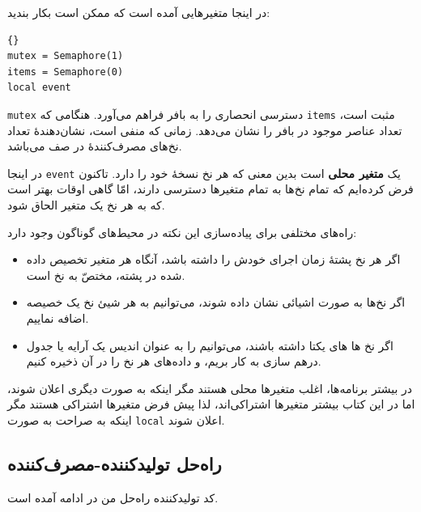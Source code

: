 \documentclass{book}
\newcommand{\clearemptydoublepage}{}%
\begin{document}
    در اینجا متغیرهایی آمده است که ممکن است بکار بندید:

\begin{latin}
\begin{lstlisting}[title=\rl{مقداردهی اولیه تولیدکننده-مصرف‌کننده}]{}
mutex = Semaphore(1)
items = Semaphore(0)
local event
\end{lstlisting}
\end{latin}

    {\tt mutex} دسترسی انحصاری را به بافر فراهم می‌آورد. 
    هنگامی که {\tt items} مثبت است، تعداد عناصر موجود در بافر را نشان می‌دهد. 
    زمانی که منفی است، نشان‌دهندهٔ تعداد نخ‌های مصرف‌کنندهٔ در صف می‌باشد. 

    در اینجا {\tt event}
    یک \textbf{متغیر محلی} است بدین معنی که هر نخ نسخهٔ خود را دارد.
    تاکنون فرض کرده‌ایم که تمام نخ‌ها به تمام متغیرها دسترسی دارند، امّا گاهی اوقات بهتر است که به هر نخ یک متغیر الحاق شود.

    راه‌های مختلفی برای پیاده‌سازی این نکته در محیط‌های گوناگون وجود دارد:
    
\begin{itemize}

\item 
    اگر هر نخ پشتهٔ زمان اجرای خودش را داشته باشد، آنگاه هر متغیر تخصیص داده شده در پشته، 
    مختصّ به نخ است.

\item 
    اگر نخ‌ها به صورت اشیائی نشان داده شوند، می‌توانیم به هر شیئ نخ یک خصیصه اضافه نماییم.

\item 
    اگر نخ ها های یکتا داشته باشند، می‌توانیم  را به عنوان اندیس یک آرایه یا جدول درهم سازی به کار بریم، 
    و داده‌های هر نخ را در آن ذخیره کنیم.

\end{itemize}

    در بیشتر برنامه‌ها، اغلب متغیرها محلی هستند مگر اینکه به صورت دیگری اعلان شوند، 
    اما در این کتاب بیشتر متغیرها اشتراکی‌اند، لذا پیش فرض متغیرها اشتراکی هستند مگر اینکه به صراحت به صورت 
    {\tt local} اعلان شوند.


\clearemptydoublepage
\subsection{راه‌حل تولیدکننده-مصرف‌کننده}

    کد تولیدکننده راه‌حل من در ادامه آمده است. 
\end{document}
